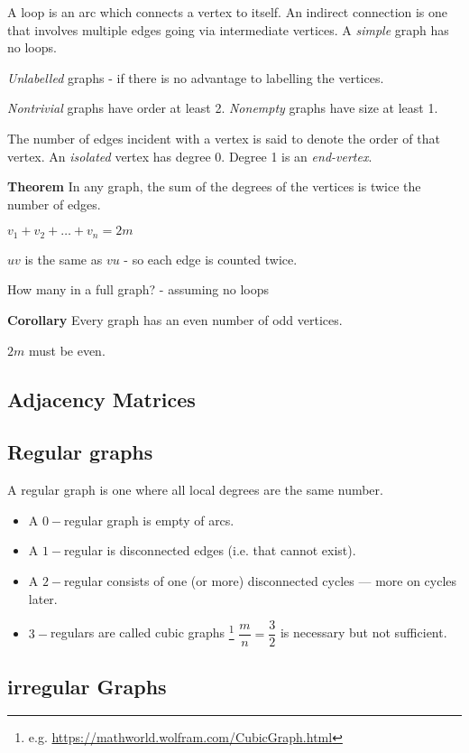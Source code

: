 A loop is an arc which connects a vertex to itself. An indirect connection is one that involves multiple edges going via intermediate vertices. A \textit{simple} graph has no loops. 

\textit{Unlabelled} graphs - if there is no advantage to labelling the vertices. 

\textit{Nontrivial} graphs have order at least 2. \textit{Nonempty} graphs have size at least 1. 

The number of edges incident with a vertex is said to denote the order of that vertex. An \textit{isolated} vertex has degree 0. Degree 1 is an \textit{end-vertex}. 

\textbf{Theorem} In any graph, the sum of the degrees of the vertices is twice the number of edges. 

$v_1 + v_2 + \ldots + v_n = 2m$ 

$uv$ is the same as $vu$ - so each edge is counted twice. 

How many in a full graph? - assuming no loops 

\textbf{Corollary} Every graph has an even number of odd vertices. 

$2m$ must be even. 

\subsection{Adjacency Matrices}

\subsection{Regular graphs}

A regular graph is one where all local degrees are the same number. 

\begin{itemize}
	\item A $0-$regular graph is empty of arcs. 
	\item A $1-$regular is disconnected edges (i.e. that cannot exist). 	
	\item  A $2-$regular consists of one (or more) disconnected cycles --- more on cycles later. 
	\item $3-$regulars are called cubic graphs \footnote{e.g. \url{https://mathworld.wolfram.com/CubicGraph.html}} $\dfrac{m}{n} = \dfrac{3}{2}$ is necessary but not sufficient. 
\end{itemize}

\subsection{irregular Graphs}

